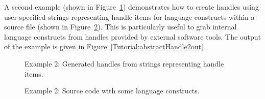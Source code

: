A second example (shown in Figure~\ref{Tutorial:abstractHandle2})
demonstrates how to create handles using user-specified strings
representing handle items for language constructs within a source file
(shown in Figure~\ref{Tutorial:abstractHandle2input}). 
This is particularly useful to grab internal language constructs from handles provided by external software tools. 
The output of the example is given in Figure~\ref{Tutorial:abstractHandle2out}.

\begin{figure}[!h]
{\indent
{\mySmallestFontSize
\begin{latexonly}
  
\end{latexonly}

\begin{htmlonly}
   
\end{htmlonly}

}
}
\caption{Example 2: Generated handles from strings representing handle items.}
\label{Tutorial:abstractHandle2}
\end{figure}

\begin{figure}[!h]
{\indent
{\mySmallestFontSize
\begin{latexonly}
  
\end{latexonly}

\begin{htmlonly}
   
\end{htmlonly}

}
}
\caption{Example 2: Source code with some language constructs.}
\label{Tutorial:abstractHandle2input}
\end{figure}


